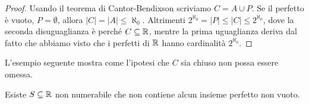\begin{proof}
	Usando il teorema di Cantor-Bendixson scriviamo $C = A \cup P$. Se il perfetto è vuoto, $P = \emptyset$, allora $|C| = |A| \leq \aleph_0$.
	Altrimenti $2^{\aleph_0} = |P| \leq |C| \leq 2^{\aleph_0}$, dove la seconda disuguaglianza è perché $C \subseteq \mathbb R$, mentre la prima uguaglianza 
	deriva dal fatto che abbiamo visto che i perfetti di $\mathbb R$ hanno cardinalità $2^{\aleph_0}$.
\end{proof}

L'esempio seguente mostra come l'ipotesi che $C$ sia chiuso non possa essere omessa.

\begin{example}
	Esiste $S \subseteq \mathbb R$ non numerabile che non contiene alcun insieme perfetto non vuoto.
\end{example}

